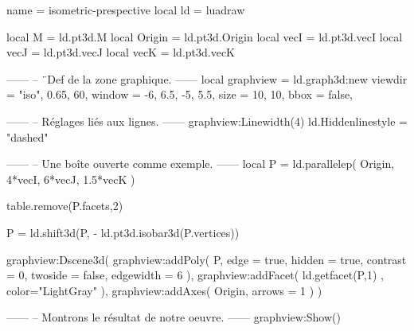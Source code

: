 \documentclass[border = 3pt]{standalone}
\begin{document}
\begin{luadraw*}{name = isometric-prespective}
local ld = luadraw

local M      = ld.pt3d.M
local Origin = ld.pt3d.Origin
local vecI   = ld.pt3d.vecI
local vecJ   = ld.pt3d.vecJ
local vecK   = ld.pt3d.vecK

------
-- ¨Def de la zone graphique.
------
local graphview = ld.graph3d:new{
  viewdir = {"iso", 0.65, 60},
  window  = {-6, 6.5, -5, 5.5},
  size    = {10, 10},
  bbox    = false,
}

------
-- Réglages liés aux lignes.
------
graphview:Linewidth(4)
ld.Hiddenlinestyle = "dashed"

------
-- Une boîte ouverte comme exemple.
------
local P = ld.parallelep(
  Origin,
  4*vecI, 6*vecJ, 1.5*vecK
)

table.remove(P.facets,2)

P = ld.shift3d(P, - ld.pt3d.isobar3d(P.vertices))

graphview:Dscene3d(
  graphview:addPoly(
    P,
    {
      edge      = true,
      hidden    = true,
      contrast  = 0,
      twoside   = false,
      edgewidth = 6
    }
  ),
  graphview:addFacet(
    ld.getfacet(P,1) ,
    {
      color="LightGray"
    }
  ),
  graphview:addAxes(
    Origin,
    {
      arrows = 1
    }
  )
)

------
-- Montrons le résultat de notre oeuvre.
------
graphview:Show()
\end{luadraw*}
\end{document}
